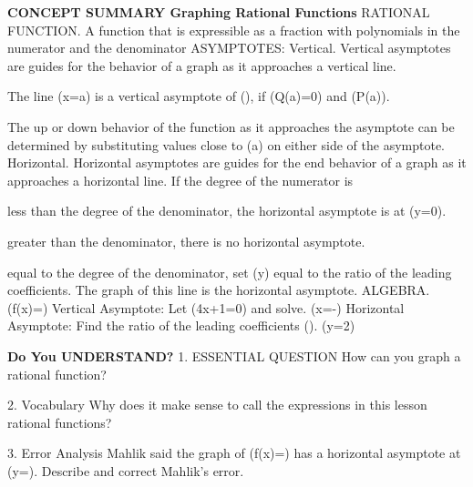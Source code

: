 \documentclass{article}
\newenvironment{concept-summary}{}{}    %
\newcommand{\answer}[1]{}               %
\newcommand{\placeholder}[2]{}          %
\begin{document}
\begin{concept-summary}
\textbf{CONCEPT SUMMARY Graphing Rational Functions}
RATIONAL FUNCTION. A function that is expressible as a fraction with polynomials in the numerator and the denominator
ASYMPTOTES: Vertical. Vertical asymptotes are guides for the behavior of a graph as it approaches a vertical line.
\item The line (x=a) is a vertical asymptote of (), if (Q(a)=0) and (P(a)).
\item The up or down behavior of the function as it approaches the asymptote can be determined by substituting values close to (a) on either side of the asymptote.
Horizontal. Horizontal asymptotes are guides for the end behavior of a graph as it approaches a horizontal line.
If the degree of the numerator is
\item less than the degree of the denominator, the horizontal asymptote is at (y=0).
\item greater than the denominator, there is no horizontal asymptote.
\item equal to the degree of the denominator, set (y) equal to the ratio of the leading coefficients. The graph of this line is the horizontal asymptote.
ALGEBRA. (f(x)=)
Vertical Asymptote: Let (4x+1=0) and solve.
(x=-)
Horizontal Asymptote: Find the ratio of the leading coefficients ().
(y=2)
\placeholder{graph}{Summary red (8x-3)/(4x+1), axes x,y,O, window -5 to5 both, unit grid, labels -4,-2,2,4; dashed green x=-1/4 and dashed blue y2, end arrows. Two red branches, four arrows, left above2 and right below2, y-intercept-3 and x-intercept3/8 unmarked.}
\textbf{Do You UNDERSTAND?}
1. ESSENTIAL QUESTION How can you graph a rational function?
\answer{Vertical asymptotes may occur when the denominator equals 0. Use long division to rewrite the function. Use the quotient to identify the horizontal asymptotes. Sketch the asymptotes. Then make a table of values to determine behavior near the asymptotes.}
2. Vocabulary Why does it make sense to call the expressions in this lesson rational functions?
\answer{They are expressed as fractions, or ratios.}
3. Error Analysis Mahlik said the graph of (f(x)=) has a horizontal asymptote at (y=). Describe and correct Mahlik's error.
\answer{Mahlik found the ratio of the leading terms. But the degree of the numerator and denominator are not the same, so the horizontal asymptote is not the ratio of the leading terms. The horizontal asymptote is at (y=0).}

\end{concept-summary}
\end{document}
